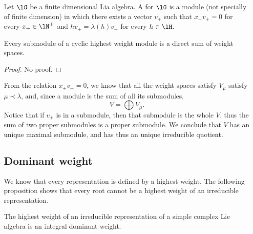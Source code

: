 \begin{definition}
Let $\lG$ be a finite dimensional Lia algebra. A  for $\lG$ is a module (not specially of finite dimension) in which there exists a vector $v_+$ such that $x_+v_+=0$ for every $x_+\in\lN^+$ and $hv_+=\lambda(h)v_+$ for every $h\in\lH$.
\end{definition}

\begin{proposition}
Every submodule of a cyclic highest weight module is a direct sum of weight spaces.
\end{proposition}
\begin{proof}
    No proof.
\end{proof}

From the relation $x_+v_+=0$, we know that all the weight spaces satisfy $V_{\mu}$ satisfy $\mu\prec\lambda$, and, since a module is the sum of all its submodules,
\begin{equation}        \label{EqVsumValpha}
    V=\bigoplus V_{\mu}.
\end{equation}
Notice that if $v_+$ is in a submodule, then that submodule is the whole $V$, thus the sum of two proper submodules is a proper submodule. We conclude that $V$ has an unique maximal submodule, and has thus an unique irreducible quotient.

\subsection{Dominant weight}
\label{SubSecDomiunSei}

We know that every representation is defined by a highest weight. The following proposition\cite{Anupam} shows that every root cannot be a highest weight of an irreducible representation.

\begin{proposition}
    The highest weight of an irreducible representation of a simple complex Lie algebra is an integral dominant weight.
\end{proposition}

